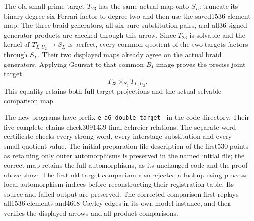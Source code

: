 The old small-prime target $T_{23}$ has the same actual map onto
$S_L$: truncate its binary degree-six Ferrari factor to degree two
and then use the saved1536-element map. The three braid generators,
all six pure substitution pairs, and all36 signed generator products
are checked through this arrow. Since $T_{23}$ is solvable and the
kernel of $T_{L,U_2}\to S_L$ is perfect, every common quotient of
the two targets factors through $S_L$. Their two displayed maps
already agree on the actual braid generators. Applying Goursat to
that common $B_4$ image proves the precise joint target
\begin{equation}
 T_{23}\times_{S_L}T_{L,U_2}.
 \tag{E.63.35}\label{eq:E63-target-T23}
\end{equation}
This equality retains both full target projections and the actual
solvable comparison map.

The new programs have prefix \texttt{e\_a6\_double\_target\_} in
the code directory. Their five complete chains check3091439 final
Schreier relations. The separate word certificate checks every strong
word, every interstage substitution and every small-quotient value.
The initial preparation-file description of the first530 points as
retaining only outer automorphisms is preserved in the named initial
file; the correct map retains the full automorphisms, as its unchanged
code and the proof above show. The first old-target comparison also
rejected a lookup using process-local automorphism indices before
reconstructing their registration table. Its source and failed output
are preserved. The corrected comparison first replays all1536 elements
and4608 Cayley edges in its own model instance, and then verifies the
displayed arrows and all product comparisons.
